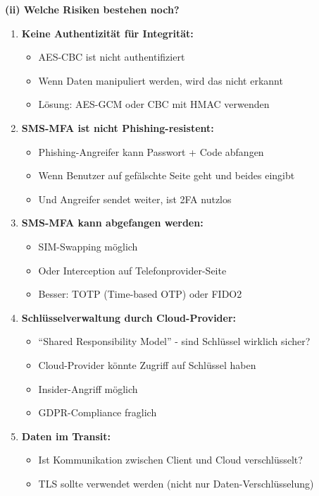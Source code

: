\documentclass[12pt,a4paper]{article}
\begin{document}
\begin{tcolorbox}[colback=solutionbg, colframe=black!30]

\textbf{(ii) Welche Risiken bestehen noch?} \checkmark

\begin{enumerate}[1.]
    \item \textbf{Keine Authentizität für Integrität:}
    \begin{itemize}
        \item AES-CBC ist nicht authentifiziert
        \item Wenn Daten manipuliert werden, wird das nicht erkannt
        \item Lösung: AES-GCM oder CBC mit HMAC verwenden
    \end{itemize}
    
    \item \textbf{SMS-MFA ist nicht Phishing-resistent:}
    \begin{itemize}
        \item Phishing-Angreifer kann Passwort + Code abfangen
        \item Wenn Benutzer auf gefälschte Seite geht und beides eingibt
        \item Und Angreifer sendet weiter, ist 2FA nutzlos
    \end{itemize}
    
    \item \textbf{SMS-MFA kann abgefangen werden:}
    \begin{itemize}
        \item SIM-Swapping möglich
        \item Oder Interception auf Telefonprovider-Seite
        \item Besser: TOTP (Time-based OTP) oder FIDO2
    \end{itemize}
    
    \item \textbf{Schlüsselverwaltung durch Cloud-Provider:}
    \begin{itemize}
        \item ``Shared Responsibility Model'' - sind Schlüssel wirklich sicher?
        \item Cloud-Provider könnte Zugriff auf Schlüssel haben
        \item Insider-Angriff möglich
        \item GDPR-Compliance fraglich
    \end{itemize}
    
    \item \textbf{Daten im Transit:}
    \begin{itemize}
        \item Ist Kommunikation zwischen Client und Cloud verschlüsselt?
        \item TLS sollte verwendet werden (nicht nur Daten-Verschlüsselung)
    \end{itemize}
    

\end{enumerate}
\end{tcolorbox}
\end{document}
